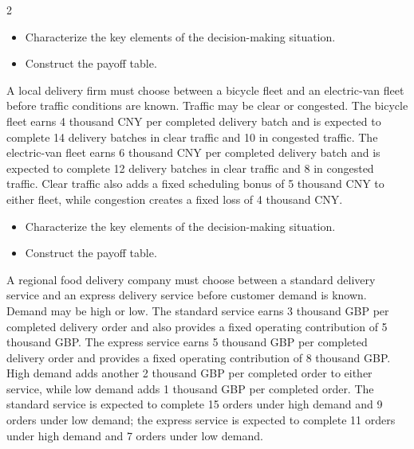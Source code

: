 \begin{multicols}{2}
		\begin{itemize}
			\item [\textbf{(C1)}] Characterize the key elements of the decision-making situation. 
			\item [\textbf{(C2)}] Construct the payoff table. 
		\end{itemize}
	
		
		A local delivery firm must choose between a bicycle fleet and an electric-van fleet before traffic conditions are known. Traffic may be clear or congested. The bicycle fleet earns 4 thousand CNY per completed delivery batch and is expected to complete 14 delivery batches in clear traffic and 10 in congested traffic. The electric-van fleet earns 6 thousand CNY per completed delivery batch and is expected to complete 12 delivery batches in clear traffic and 8 in congested traffic. Clear traffic also adds a fixed scheduling bonus of 5 thousand CNY to either fleet, while congestion creates a fixed loss of 4 thousand CNY.		\vspace*{-2mm}
		
		\begin{itemize}
			\item [\textbf{(C1)}] Characterize the key elements of the decision-making situation. 
			\item [\textbf{(C2)}] Construct the payoff table. 
		\end{itemize}
		
		\newpage 
		
		A regional food delivery company must choose between a standard delivery service and an express delivery service before customer demand is known. Demand may be high or low. The standard service earns 3 thousand GBP per completed delivery order and also provides a fixed operating contribution of 5 thousand GBP. The express service earns 5 thousand GBP per completed delivery order and provides a fixed operating contribution of 8 thousand GBP. High demand adds another 2 thousand GBP per completed order to either service, while low demand adds 1 thousand GBP per completed order. The standard service is expected to complete 15 orders under high demand and 9 orders under low demand; the express service is expected to complete 11 orders under high demand and 7 orders under low demand.
		

\end{multicols}
